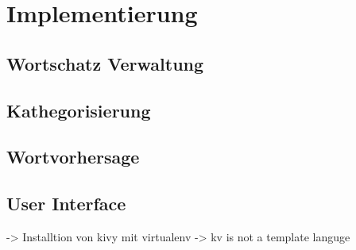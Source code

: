 \section{Implementierung}

	\subsection{Wortschatz Verwaltung}
	\subsection{Kathegorisierung}
	\subsection{Wortvorhersage}
    \subsection{User Interface}
    	 -> Installtion von kivy mit virtualenv
         -> kv is not a template languge